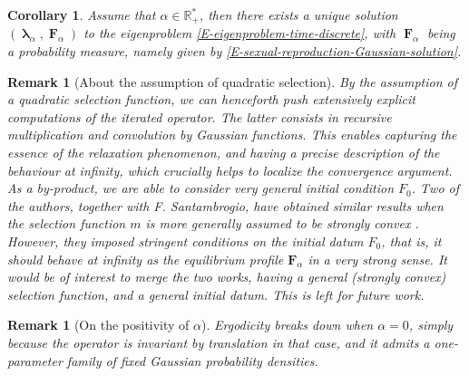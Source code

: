 \documentclass[reqno]{amsart}
\newtheorem{corollary}[definition]{Corollary}
\newtheorem{remark}[definition]{Remark}
\DeclareMathOperator{\blambda}{\boldsymbol{\lambda}}
\DeclareMathOperator{\bF}{\boldsymbol{F}}
\numberwithin{equation}{section}
\begin{document}
{\begin{corollary}\label{C-main}
Assume that $\alpha\in \mathbb{R}_+^*$, then there exists a unique solution $(\blambda_\alpha,\bF_\alpha)$ to the eigenproblem \eqref{E-eigenproblem-time-discrete}, with $\bF_\alpha$ being a  probability measure, namely given by \eqref{E-sexual-reproduction-Gaussian-solution}.
\end{corollary}

\begin{remark}[About the assumption of quadratic selection]
By the assumption of a quadratic selection function, we can henceforth push extensively explicit computations of the iterated operator. The latter consists in recursive multiplication and convolution by Gaussian functions. This enables capturing the essence of the relaxation phenomenon, and having a precise description of the behaviour at infinity, which crucially helps to localize the convergence argument. As a by-product, we are able to consider very general initial condition $F_0$. Two of the authors, together with F. Santambrogio, have obtained similar results when the selection function $m$ is more generally assumed to be strongly convex \cite{CPS-23-arxiv}. However, they imposed stringent conditions on the initial datum $F_0$, that is, it should behave at infinity as the equilibrium profile $\mathbf{F}_\alpha$ in a very strong sense. It would be of interest to merge the two works, having a general (strongly convex) selection function, and a general initial datum. This is left for future work.
\end{remark}

\begin{remark}[On the positivity of $\alpha$]
Ergodicity breaks down when $\alpha=0$, simply because the operator is invariant by translation in that case, and it admits a one-parameter family of fixed Gaussian probability densities. 
\end{remark}

}
\end{document}
